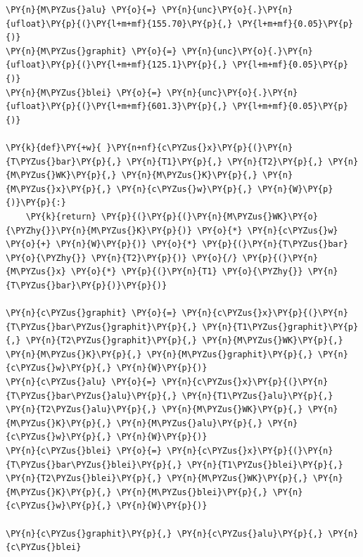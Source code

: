     \begin{tcolorbox}[breakable, size=fbox, boxrule=1pt, pad at break*=1mm,colback=cellbackground, colframe=cellborder]
\begin{Verbatim}[commandchars=\\\{\}]
\PY{n}{M\PYZus{}alu} \PY{o}{=} \PY{n}{unc}\PY{o}{.}\PY{n}{ufloat}\PY{p}{(}\PY{l+m+mf}{155.70}\PY{p}{,} \PY{l+m+mf}{0.05}\PY{p}{)}
\PY{n}{M\PYZus{}graphit} \PY{o}{=} \PY{n}{unc}\PY{o}{.}\PY{n}{ufloat}\PY{p}{(}\PY{l+m+mf}{125.1}\PY{p}{,} \PY{l+m+mf}{0.05}\PY{p}{)}
\PY{n}{M\PYZus{}blei} \PY{o}{=} \PY{n}{unc}\PY{o}{.}\PY{n}{ufloat}\PY{p}{(}\PY{l+m+mf}{601.3}\PY{p}{,} \PY{l+m+mf}{0.05}\PY{p}{)}

\PY{k}{def}\PY{+w}{ }\PY{n+nf}{c\PYZus{}x}\PY{p}{(}\PY{n}{T\PYZus{}bar}\PY{p}{,} \PY{n}{T1}\PY{p}{,} \PY{n}{T2}\PY{p}{,} \PY{n}{M\PYZus{}WK}\PY{p}{,} \PY{n}{M\PYZus{}K}\PY{p}{,} \PY{n}{M\PYZus{}x}\PY{p}{,} \PY{n}{c\PYZus{}w}\PY{p}{,} \PY{n}{W}\PY{p}{)}\PY{p}{:}
    \PY{k}{return} \PY{p}{(}\PY{p}{(}\PY{n}{M\PYZus{}WK}\PY{o}{\PYZhy{}}\PY{n}{M\PYZus{}K}\PY{p}{)} \PY{o}{*} \PY{n}{c\PYZus{}w} \PY{o}{+} \PY{n}{W}\PY{p}{)} \PY{o}{*} \PY{p}{(}\PY{n}{T\PYZus{}bar} \PY{o}{\PYZhy{}} \PY{n}{T2}\PY{p}{)} \PY{o}{/} \PY{p}{(}\PY{n}{M\PYZus{}x} \PY{o}{*} \PY{p}{(}\PY{n}{T1} \PY{o}{\PYZhy{}} \PY{n}{T\PYZus{}bar}\PY{p}{)}\PY{p}{)}

\PY{n}{c\PYZus{}graphit} \PY{o}{=} \PY{n}{c\PYZus{}x}\PY{p}{(}\PY{n}{T\PYZus{}bar\PYZus{}graphit}\PY{p}{,} \PY{n}{T1\PYZus{}graphit}\PY{p}{,} \PY{n}{T2\PYZus{}graphit}\PY{p}{,} \PY{n}{M\PYZus{}WK}\PY{p}{,} \PY{n}{M\PYZus{}K}\PY{p}{,} \PY{n}{M\PYZus{}graphit}\PY{p}{,} \PY{n}{c\PYZus{}w}\PY{p}{,} \PY{n}{W}\PY{p}{)}
\PY{n}{c\PYZus{}alu} \PY{o}{=} \PY{n}{c\PYZus{}x}\PY{p}{(}\PY{n}{T\PYZus{}bar\PYZus{}alu}\PY{p}{,} \PY{n}{T1\PYZus{}alu}\PY{p}{,} \PY{n}{T2\PYZus{}alu}\PY{p}{,} \PY{n}{M\PYZus{}WK}\PY{p}{,} \PY{n}{M\PYZus{}K}\PY{p}{,} \PY{n}{M\PYZus{}alu}\PY{p}{,} \PY{n}{c\PYZus{}w}\PY{p}{,} \PY{n}{W}\PY{p}{)}
\PY{n}{c\PYZus{}blei} \PY{o}{=} \PY{n}{c\PYZus{}x}\PY{p}{(}\PY{n}{T\PYZus{}bar\PYZus{}blei}\PY{p}{,} \PY{n}{T1\PYZus{}blei}\PY{p}{,} \PY{n}{T2\PYZus{}blei}\PY{p}{,} \PY{n}{M\PYZus{}WK}\PY{p}{,} \PY{n}{M\PYZus{}K}\PY{p}{,} \PY{n}{M\PYZus{}blei}\PY{p}{,} \PY{n}{c\PYZus{}w}\PY{p}{,} \PY{n}{W}\PY{p}{)}

\PY{n}{c\PYZus{}graphit}\PY{p}{,} \PY{n}{c\PYZus{}alu}\PY{p}{,} \PY{n}{c\PYZus{}blei}
\end{Verbatim}
\end{tcolorbox}

